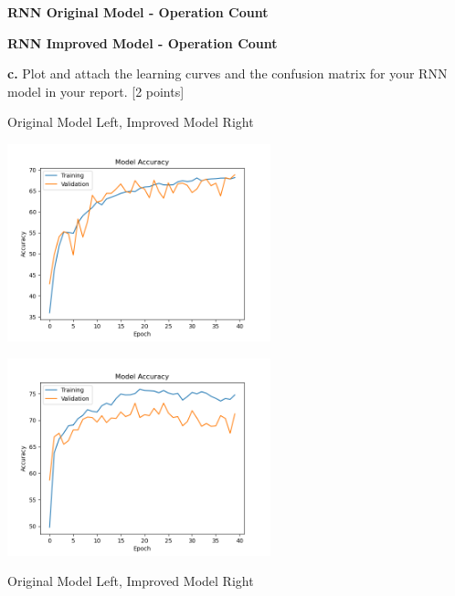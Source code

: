 \documentclass[12pt]{article}
\begin{document}
{{{{{{{{{{{{{{{{\bigskip

\textbf{RNN Original Model - Operation Count}

\bigskip

\textbf{RNN Improved Model - Operation Count}

\bigskip


\bigskip

\textbf{c.} Plot and attach the learning curves and the confusion matrix for your RNN model in your report. [2 points]

\bigskip

Original Model Left, Improved Model Right

\bigskip

{\includegraphics[width = 3in]{images/RNN_accuracies}
{\includegraphics[width = 3in]{images/RNN_improved_accuracies}

\bigskip

Original Model Left, Improved Model Right

\bigskip

}}}}}}}}}}}}}}}}}}
\end{document}
